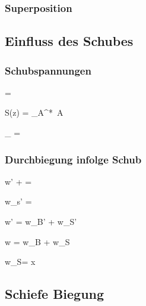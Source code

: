 \documentclass[11pt]{article}
\newcommand{\1}{ {\mathds{1}} }
\newcommand{\td}{\,\text{d}}
\begin{document}
\begin{multicols}{3}
		\subsubsection{Superposition}
		\subsection{Einfluss des Schubes}
		\subsubsection{Schubspannungen}

		\begin{formel}{4.35}
			 =  \zeta
		\end{formel}
		\begin{formel}{4.36}
			S(z) = \int\limits_{A^*} \zeta \td A
		\end{formel}
		\begin{formel}{4.37}
			_{} = 
		\end{formel}

		\subsubsection{Durchbiegung infolge Schub}

		\begin{formel}{4.40}
			w' + \psi = 
		\end{formel}
		\begin{formel}{4.41}
			w_s' = 
		\end{formel}
		\begin{formel}{4.42}
			w' = w_B' + w_S'
		\end{formel}
		\begin{formel}{4.43}
			w = w_B + w_S
		\end{formel}
		\begin{formel}{4.44}
			w_S= x
		\end{formel}

		\subsection{Schiefe Biegung}


\end{multicols}
\end{document}
